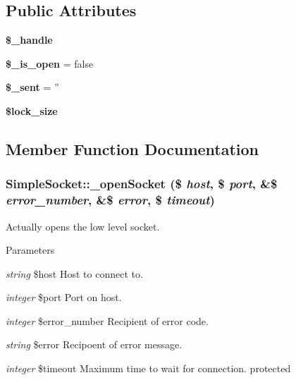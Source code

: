 \subsection*{Public Attributes}
\begin{DoxyCompactItemize}
\item 
\hypertarget{class_simple_socket_ab2342aa10e3e3283b5812a267749d492}{
{\bfseries \$\_\-handle}}
\label{class_simple_socket_ab2342aa10e3e3283b5812a267749d492}

\item 
\hypertarget{class_simple_socket_ae4aa77f7a947f30f43eca111d875ee08}{
{\bfseries \$\_\-is\_\-open} = false}
\label{class_simple_socket_ae4aa77f7a947f30f43eca111d875ee08}

\item 
\hypertarget{class_simple_socket_ac56d4765c82bf57a56e85cd8e8e9f334}{
{\bfseries \$\_\-sent} = ''}
\label{class_simple_socket_ac56d4765c82bf57a56e85cd8e8e9f334}

\item 
\hypertarget{class_simple_socket_a9071422b3710dc0dcf1ec387c2aa2315}{
{\bfseries \$lock\_\-size}}
\label{class_simple_socket_a9071422b3710dc0dcf1ec387c2aa2315}

\end{DoxyCompactItemize}


\subsection{Member Function Documentation}
\hypertarget{class_simple_socket_a40c391808591c437200a14ebb2619f83}{
\subsubsection[{\_\-openSocket}]{\setlength{\rightskip}{0pt plus 5cm}SimpleSocket::\_\-openSocket (\$ {\em host}, \/  \$ {\em port}, \/  \&\$ {\em error\_\-number}, \/  \&\$ {\em error}, \/  \$ {\em timeout})}}
\label{class_simple_socket_a40c391808591c437200a14ebb2619f83}
Actually opens the low level socket. 
\begin{DoxyParams}{Parameters}
\item[{\em string}]\$host Host to connect to. \item[{\em integer}]\$port Port on host. \item[{\em integer}]\$error\_\-number Recipient of error code. \item[{\em string}]\$error Recipoent of error message. \item[{\em integer}]\$timeout Maximum time to wait for connection.  protected \end{DoxyParams}


